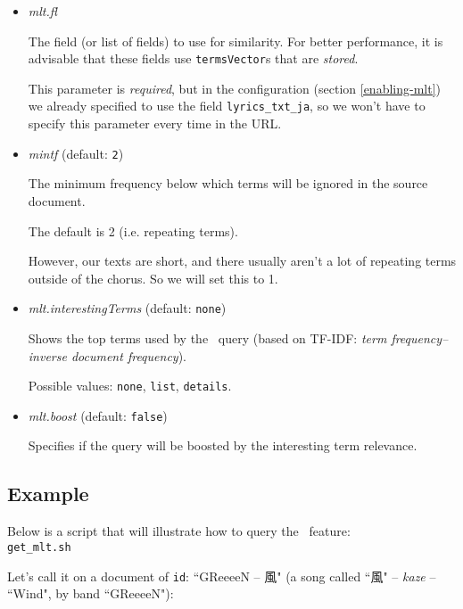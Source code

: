 \begin{itemize}
	\item \emph{mlt.fl}
	
	The field (or list of fields) to use for similarity.
	For better performance, it is advisable that these fields use 
	\texttt{termsVector}s that are \emph{stored}.
	
	This parameter is \emph{required}, but in the configuration (section \ref{enabling-mlt}) we already specified to use the field \texttt{lyrics\_txt\_ja}, so we won't have to specify this parameter every time in the URL.
	
	\item \emph{mintf} \hfill (default: \texttt{2})
	
	The minimum frequency below which terms will be ignored in the source document.
	
	The default is 2 (i.e. repeating terms). 
	
	However, our texts are short, and there usually aren't a lot of repeating terms outside of the chorus.	So we will set this to 1.
	
	\item \emph{mlt.interestingTerms} \hfill (default: \texttt{none})
	
	Shows the top terms used by the \MLT\ query (based on TF-IDF: \emph{term frequency–inverse document frequency}).
	
	Possible values: \texttt{none}, \texttt{list}, \texttt{details}.
	
	
	\item \emph{mlt.boost} \hfill (default: \texttt{false})
	
	Specifies if the query will be boosted by the interesting term relevance.
\end{itemize}

\bigskip


\subsection{Example} \label{mlt-solr-example}

Below is a script that will illustrate how to query the \MLT\ feature: \\

\texttt{get\_mlt.sh}

\bigskip

Let's call it on a document of \texttt{id}: ``GReeeeN -- 風" (a song called ``風" -- \emph{kaze} -- ``Wind", by band ``GReeeeN"):

